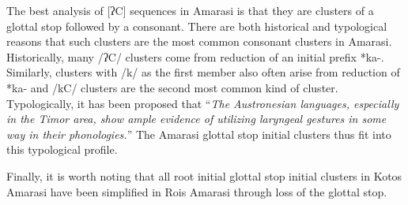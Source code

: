 The best analysis of [ʔC] sequences in Amarasi
is that they are clusters of a glottal stop followed by a consonant.
There are both historical and typological reasons that such
clusters are the most common consonant clusters in Amarasi.
Historically, many /ʔC/ clusters come from reduction of an initial prefix *ka-.
Similarly, clusters with /k/ as the first member also
often arise from reduction of *ka- \citep[387f]{ed18b}
and /kC/ clusters are the second most common kind of cluster.
Typologically, it has been proposed that ``\emph{The Austronesian languages,
especially in the Timor area, show ample evidence of
utilizing laryngeal gestures in some way in their phonologies.}'' \citep[216]{do03}
The Amarasi glottal stop initial clusters thus fit into this typological profile.

Finally, it is worth noting that all root initial glottal
stop initial clusters in Kotos Amarasi have
been simplified in Ro{\Q}is Amarasi through loss
of the glottal stop.